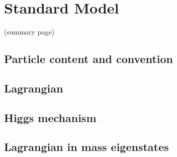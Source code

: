 \documentclass[CheatSheet]{subfiles}
\begin{document}
\summarystyle
\section{Standard Model}
(summary page)

\newpage
\detailstyle

\subsection{Particle content and convention}
\subsection{Lagrangian}
\subsection{Higgs mechanism}
\subsection{Lagrangian in mass eigenstates}
\end{document}
